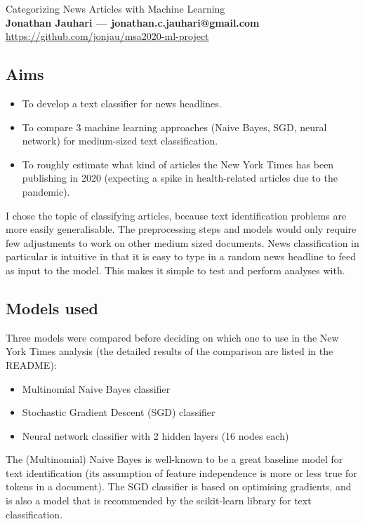 \documentclass[11pt]{article}
\begin{document}
\Large{Categorizing News Articles with Machine Learning} \\[2mm]
\large\textbf{Jonathan Jauhari --- jonathan.c.jauhari@gmail.com} \\[2mm]
\url{https://github.com/jonjau/msa2020-ml-project}

\subsection*{Aims}

\begin{itemize}
    \item To develop a text classifier for news headlines.
    \item To compare 3 machine learning approaches (Naive Bayes, SGD, neural 
          network) for medium-sized text classification.
    \item To roughly estimate what kind of articles the New York Times has been
          publishing in 2020 (expecting a spike in health-related articles
          due to the pandemic).
\end{itemize}

I chose the topic of classifying articles, because text identification
problems are more easily generalisable. The preprocessing steps and models
would only require few adjustments to work on other medium sized documents.
News classification in particular is intuitive in that it is easy to type in
a random news headline to feed as input to the model. This makes it simple to
test and perform analyses with.

\subsection*{Models used}

Three models were compared before deciding on which one to use in the New
York Times analysis (the detailed results of the comparison are listed in the
README):

\begin{itemize}
    \item Multinomial Naive Bayes classifier
    \item Stochastic Gradient Descent (SGD) classifier
    \item Neural network classifier with 2 hidden layers (16 nodes each)
\end{itemize}

The (Multinomial) Naive Bayes is well-known to be a great baseline model for
text identification (its assumption of feature independence is more or less
true for tokens in a document). The SGD classifier is based on
optimising gradients, and is also a model that is recommended by the
scikit-learn library for text classification.
\end{document}
